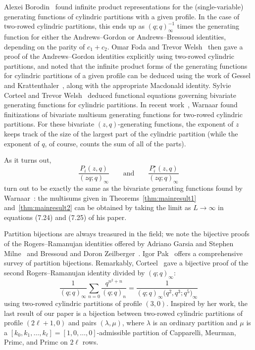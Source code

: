 \documentclass[pdftex]{sigma}
\numberwithin{equation}{section}
\theoremstyle{definition}
\begin{document}
Alexei Borodin~\cite{Bor} found infinite product representations for the (single-variable) generating functions of cylindric partitions with a given profile. In the case of two-rowed cylindric partitions, this ends up as $(q;q)^{-1}_\infty$ times the generating function for either the Andrews--Gordon or Andrews--Bressoud identities, depending on the parity of $c_1+c_2$. Omar Foda and Trevor Welsh~\cite{FodWel} then gave a proof of the Andrews--Gordon identities explicitly using two-rowed cylindric partitions, and noted that the infinite product forms of the generating functions for cylindric partitions of a given profile can be deduced using the work of Gessel and Krattenthaler~\cite{GesKra}, along with the appropriate Macdonald identity. Sylvie Corteel and Trevor Welsh~\cite{CW} deduced functional equations governing bivariate generating functions for cylindric partitions. In recent work~\cite{WarnCyl}, Warnaar found finitizations of bivariate multisum generating functions for two-rowed cylindric partitions. For these bivariate $(z,q)$-generating functions, the exponent of $z$ keeps track of the size of the largest part of the cylindric partition (while the exponent of $q$, of course, counts the sum of all of the parts).

As it turns out, \[ \frac{P_i(z,q)}{(zq;q)_\infty} \qquad \text{and} \qquad \displaystyle \frac{P_i^\star (z,q)}{(zq;q)_\infty}\] turn out to be exactly the same as the bivariate generating functions found by Warnaar~\cite{WarnCyl}: the multisums given in Theorems~\ref{thm:mainresult1} and~\ref{thm:mainresult2} can be obtained by taking the limit as $L\to \infty$ in equations (7.24) and (7.25) of his paper.

Partition bijections are always treasured in the field; we note the bijective proofs of the Rogers--Ramanujan identities offered by Adriano Garsia and Stephen Milne~\cite{GarMil} and Bressoud and Doron Zeilberger~\cite{BZ}. Igor Pak~\cite{PakSurvey} offers a comprehensive survey of partition bijections. Remarkably, Corteel~\cite{Cort} gave a bijective proof of the second Rogers--Ramanujan identity divided by $(q;q)_\infty$:
\begin{equation*}
\frac{1}{(q;q)_\infty}\sum_{n=0}\frac{q^{n^2+n}}{(q;q)_n} = \frac{1}{(q;q)_\infty\bigl(q^2,q^3;q^5\bigr)_\infty}
\end{equation*}
using two-rowed cylindric partitions of profile $(3,0)$. Inspired by her work, the last result of our paper is a bijection between two-rowed cylindric partitions of profile $(2\ell+1,0)$ and pairs $(\lambda,\mu)$, where $\lambda$ is an ordinary partition and $\mu$ is a $[k_0,k_1,\dots,k_\ell]=[1,0,\dots,0]$-admissible partition of Capparelli, Meurman, Primc, and Primc on $2\ell$ rows.
\end{document}

